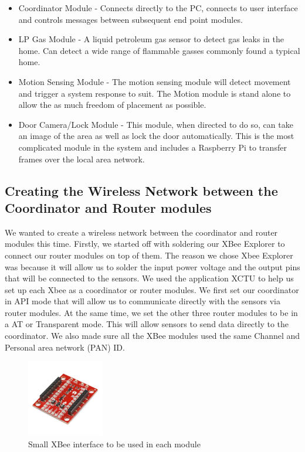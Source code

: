 \documentclass[letter,twocolumn]{report}
\begin{document}
	\begin{itemize}
		\item Coordinator Module - Connects directly to the PC, connects to user interface and controls messages between subsequent end point modules. 
		\item LP Gas Module - A liquid petroleum gas sensor to detect gas leaks in the home. Can detect a wide range of flammable gasses commonly found a typical home.
		\item Motion Sensing Module - The motion sensing module will detect movement and trigger a system response to suit. The Motion module is stand alone to allow the as much freedom of placement as possible.
		\item Door Camera/Lock Module - This module, when directed to do so, can take an image of the area as well as lock the door automatically. This is the most complicated module in the system and includes a Raspberry Pi to transfer frames over the local area network.
	\end{itemize}

	
	\subsection{Creating the Wireless Network between the Coordinator and Router modules}
	\par We wanted to create a wireless network between the coordinator and router modules this time. Firstly, we started off with soldering our XBee Explorer to connect our router modules on top of them. The reason we chose Xbee Explorer was because it will allow us to solder the input power voltage and the output pins that will be connected to the sensors. We used the application XCTU to help us set up each Xbee as a coordinator or router modules. We first set our coordinator in API mode that will allow us to communicate directly with the sensors via router modules. At the same time, we set the other three router modules to be in a AT or Transparent mode. This will allow sensors to send data directly to the coordinator. We also made sure all the XBee modules used the same Channel and Personal area network (PAN) ID. 
	\begin{figure}[h]
		\centering
		\includegraphics[width = 0.3\textwidth]{xbeeMiniExplorer.png}
		\caption{Small XBee interface to be used in each module}
	\end{figure}
\end{document}
